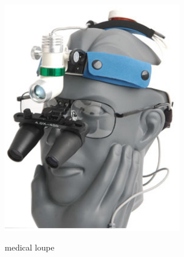 \documentclass[a4paper,10pt]{report}
\begin{document}
\begin{figure}[ht]
  \centering
	\includegraphics[width=0.7\textwidth, keepaspectratio=true]{medical-loupe-1}
  \caption{medical loupe}\cite{njnorth}
  \label{fig:medical-loupe}
\end{figure}


\clearpage
%
{}

%


 

\end{document}
